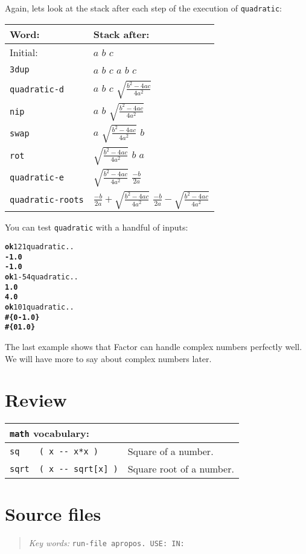 \documentclass[english]{book}
\newcommand{\chapkeywords}[1]{%
\begin{quote}
\emph{Key words:} \texttt{#1}
\end{quote}
}
\newcommand{\wordtable}[1]{{
\begin{tabularx}{12cm}{|l l X|}
#1
\hline
\end{tabularx}}}
\newcommand{\tabvocab}[1]{
\hline
\multicolumn{3}{|l|}{
\rule[-2mm]{0mm}{6mm}
\texttt{#1} vocabulary:}
\\
\hline
}
\begin{document}
Again, lets look at the stack after each step of the execution of \texttt{quadratic}:

\begin{tabular}{|l|l|}
\hline
Word:&Stack after:\\
\hline
Initial:&$a$ $b$ $c$\\
\hline
\texttt{3dup}&$a$ $b$ $c$ $a$ $b$ $c$\\
\hline
\texttt{quadratic-d}&$a$ $b$ $c$ $\sqrt{\frac{b^2-4ac}{4a^2}}$\\
\hline
\texttt{nip}&$a$ $b$ $\sqrt{\frac{b^2-4ac}{4a^2}}$\\
\hline
\texttt{swap}&$a$ $\sqrt{\frac{b^2-4ac}{4a^2}}$ $b$ \\
\hline
\texttt{rot}&$\sqrt{\frac{b^2-4ac}{4a^2}}$ $b$ $a$ \\
\hline
\texttt{quadratic-e}&$\sqrt{\frac{b^2-4ac}{4a^2}}$ $\frac{-b}{2a}$\\
\hline
\texttt{quadratic-roots}&$\frac{-b}{2a}+\sqrt{\frac{b^2-4ac}{4a^2}}$ $\frac{-b}{2a}-\sqrt{\frac{b^2-4ac}{4a^2}}$\\
\hline
\end{tabular}

You can test \texttt{quadratic} with a handful of inputs:

\begin{alltt}
\textbf{ok} 1 2 1 quadratic . .
\textbf{-1.0}
\textbf{-1.0}
\textbf{ok} 1 -5 4 quadratic . .
\textbf{1.0}
\textbf{4.0}
\textbf{ok} 1 0 1 quadratic . .
\textbf{#\{ 0 -1.0 \}
#\{ 0 1.0 \}}
\end{alltt}

The last example shows that Factor can handle complex numbers perfectly well. We will have more to say about complex numbers later.

\section*{Review}

\wordtable{
\tabvocab{math}
\texttt{sq}&
\texttt{( x -{}- x*x )}&
Square of a number.\\
\texttt{sqrt}&
\texttt{( x -{}- sqrt[x] )}&
Square root of a number.\\
}

\section{Source files}

\chapkeywords{run-file apropos.~USE: IN:}
\end{document}
